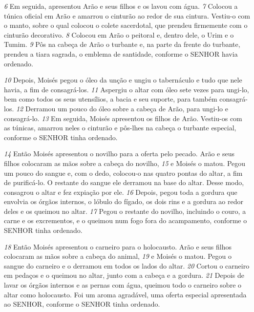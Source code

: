 \smallskip
\textit{\tiny 6} 
Em seguida, apresentou Arão e seus filhos e os lavou com água. 
\textit{\tiny 7} 
Colocou a túnica oficial em Arão e amarrou o cinturão ao redor de sua cintura.
Vestiu-o com o manto, sobre o qual colocou o colete sacerdotal, que prendeu
firmemente com o cinturão decorativo. 
\textit{\tiny 8} 
Colocou em Arão o peitoral e, dentro
dele, o Urim e o Tumim. 
\textit{\tiny 9} 
Pôs na cabeça de Arão o turbante e, na parte da frente
do turbante, prendeu a tiara sagrada, o emblema de santidade, conforme o
SENHOR havia ordenado.   

\smallskip
\textit{\tiny 10}
Depois, Moisés pegou o óleo da unção e ungiu o tabernáculo e tudo que nele
havia, a fim de consagrá-los. 
\textit{\tiny 11}
Aspergiu o altar com óleo sete vezes para ungi-lo,
bem como todos os seus utensílios, a bacia e seu suporte, para também consagrá-
los. 
\textit{\tiny 12}
Derramou um pouco do óleo sobre a cabeça de Arão, para ungi-lo e
consagrá-lo. 
\textit{\tiny 13}
Em seguida, Moisés apresentou os filhos de Arão. Vestiu-os com as
túnicas, amarrou neles o cinturão e pôs-lhes na cabeça o turbante especial,
conforme o SENHOR tinha ordenado.
   
\smallskip
\textit{\tiny 14}
Então Moisés apresentou o novilho para a oferta pelo pecado. Arão e seus
filhos colocaram as mãos sobre a cabeça do novilho, 
\textit{\tiny 15}
e Moisés o matou. Pegou
um pouco do sangue e, com o dedo, colocou-o nas quatro pontas do altar, a fim de
purificá-lo. O restante do sangue ele derramou na base do altar. Desse modo,
consagrou o altar e fez expiação por ele.
\textit{\tiny 16}
Depois, pegou toda a gordura que
envolvia os órgãos internos, o lóbulo do fígado, os dois rins e a gordura ao redor
deles e os queimou no altar. 
\textit{\tiny 17}
Pegou o restante do novilho, incluindo o couro, a
carne e os excrementos, e o queimou num fogo fora do acampamento, conforme
o SENHOR tinha ordenado.
   
\smallskip
\textit{\tiny 18}
Então Moisés apresentou o carneiro para o holocausto. Arão e seus filhos
colocaram as mãos sobre a cabeça do animal, 
\textit{\tiny 19}
e Moisés o matou. Pegou o sangue
do carneiro e o derramou em todos os lados do altar. 
\textit{\tiny 20}
Cortou o carneiro em
pedaços e o queimou no altar, junto com a cabeça e a gordura. 
\textit{\tiny 21}
Depois de lavar
os órgãos internos e as pernas com água, queimou todo o carneiro sobre o altar
como holocausto. Foi um aroma agradável, uma oferta especial apresentada ao
SENHOR, conforme o SENHOR tinha ordenado.
   
